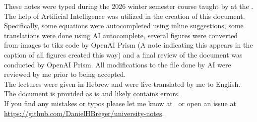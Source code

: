 \begin{myminipage}
	These notes were typed during the 2026 winter semester \textit{\courseloc} course taught by \profloc{} at the \instituteloc{}. 
	\bigskip \\ The help of Artificial Intelligence was utilized in the creation of this document. Specifically, some equations were autocompleted using inline suggestions, some translations were done using AI autocomplete, several figures were converted from images to tikz code by OpenAI Prism (A note indicating this appears in the caption of all figures created this way) and a final review of the document was conducted by OpenAI Prism. All modifications to the file done by AI were reviewed by me prior to being accepted. \bigskip \\ The lectures were given in Hebrew and were live-translated by me to English. The document is provided as is and likely contains errors. 
	\bigskip \\ If you find any mistakes or typos please let me know at \myemailloc\  or open an issue at \url{https://github.com/DanielHBreger/university-notes}.
\end{myminipage}
